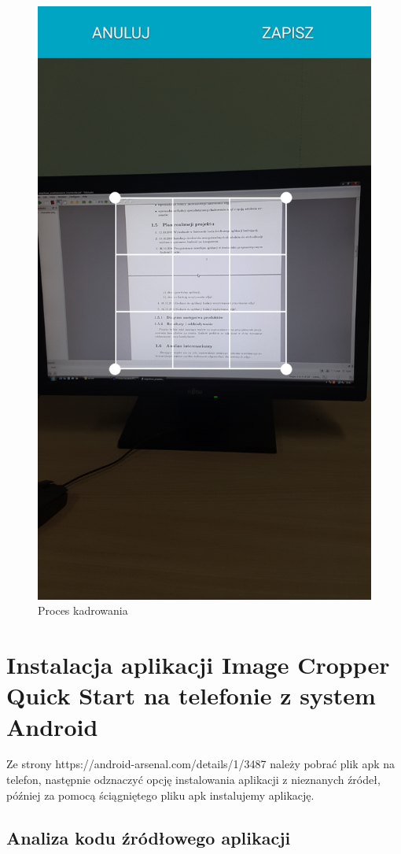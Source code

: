 \begin{itemize}
\begin{figure}[h!]
\centering
\includegraphics[width=0.3\linewidth]{fig/44}
\caption{Proces kadrowania}
\label{fig:11}
\end{figure}

\end{itemize}

\clearpage

\section{Instalacja aplikacji Image Cropper Quick Start na telefonie z system Android}
Ze strony https://android-arsenal.com/details/1/3487 należy pobrać plik apk na telefon, następnie odznaczyć opcję instalowania aplikacji z nieznanych źródeł, później za pomocą ściągniętego pliku apk instalujemy aplikację. 

\subsection{Analiza kodu źródłowego aplikacji}



